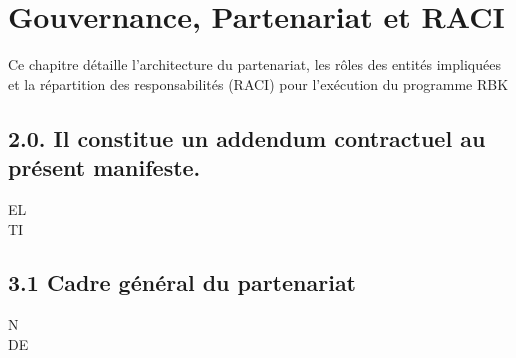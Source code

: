 \section{Gouvernance, Partenariat et RACI}
\vspace{0.5em}
\vspace{0.5em}
Ce chapitre détaille l’architecture du partenariat, les rôles des entités impliquées et la répartition des responsabilités (RACI) pour l’exécution du programme RBK\\
\subsection{2.0. Il constitue un addendum contractuel au présent manifeste.}
\vspace{0.5em}
\vspace{0.5em}
\vspace{0.5em}
\vspace{0.5em}
EL\\
TI\\
\subsection{3.1 Cadre général du partenariat}
\vspace{0.5em}
\vspace{0.5em}
\vspace{0.5em}
\vspace{0.5em}
N\\
DE\\

